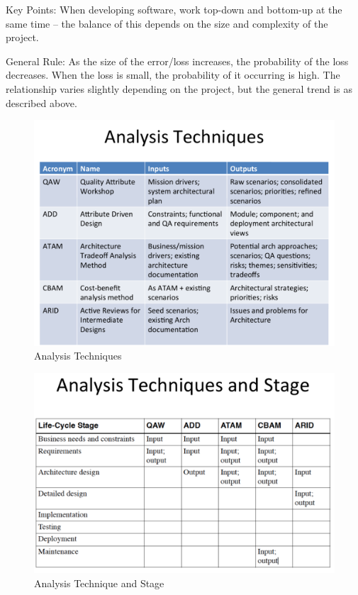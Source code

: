 \documentclass[a4paper]{article}
\begin{document}
Key Points:
When developing software, work top-down and bottom-up at the same time – the balance of this depends on the size and complexity of the project.

General Rule:
As the size of the error/loss increases, the probability of the loss decreases. When the loss is small, the probability of it occurring is high. The relationship varies slightly depending on the project, but the general trend is as described above.

\begin{figure}[H]
\begin{center} 
    \includegraphics[scale=0.3]{images/Analysis1.pdf}
    \caption{Analysis Techniques}
\end{center}
\end{figure}

\begin{figure}[H]
\begin{center} 
    \includegraphics[scale=0.3]{images/Analysis2.pdf}
    \caption{Analysis Technique and Stage}
\end{center}
\end{figure}
\end{document}

